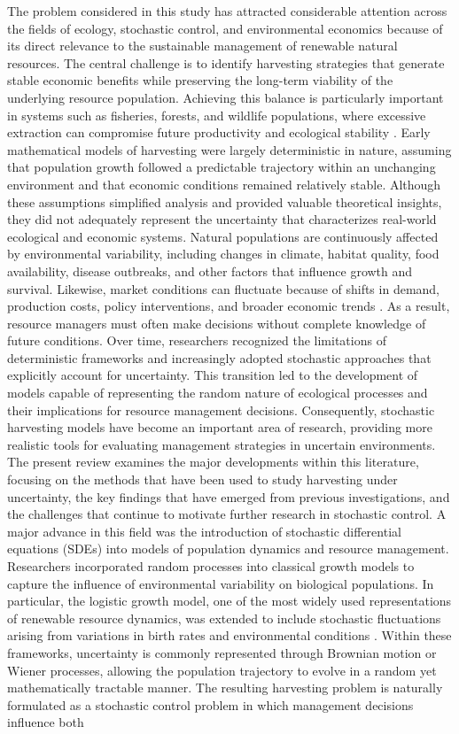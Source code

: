\documentclass[11pt]{article}
\begin{document}
	The problem considered in this study has attracted considerable attention across the fields of ecology, stochastic control, and environmental economics because of its direct relevance to the sustainable management of renewable natural resources. The central challenge is to identify harvesting strategies that generate stable economic benefits while preserving the long-term viability of the underlying resource population. Achieving this balance is particularly important in systems such as fisheries, forests, and wildlife populations, where excessive extraction can compromise future productivity and ecological stability \citep{pramanik2021consensus}. Early mathematical models of harvesting were largely deterministic in nature, assuming that population growth followed a predictable trajectory within an unchanging environment and that economic conditions remained relatively stable. Although these assumptions simplified analysis and provided valuable theoretical insights, they did not adequately represent the uncertainty that characterizes real-world ecological and economic systems. Natural populations are continuously affected by environmental variability, including changes in climate, habitat quality, food availability, disease outbreaks, and other factors that influence growth and survival. Likewise, market conditions can fluctuate because of shifts in demand, production costs, policy interventions, and broader economic trends \citep{pramanik2023cmbp,yusuf2025predictive}. As a result, resource managers must often make decisions without complete knowledge of future conditions. Over time, researchers recognized the limitations of deterministic frameworks and increasingly adopted stochastic approaches that explicitly account for uncertainty. This transition led to the development of models capable of representing the random nature of ecological processes and their implications for resource management decisions. Consequently, stochastic harvesting models have become an important area of research, providing more realistic tools for evaluating management strategies in uncertain environments. The present review examines the major developments within this literature, focusing on the methods that have been used to study harvesting under uncertainty, the key findings that have emerged from previous investigations, and the challenges that continue to motivate further research in stochastic control. A major advance in this field was the introduction of stochastic differential equations (SDEs) into models of population dynamics and resource management. Researchers incorporated random processes into classical growth models to capture the influence of environmental variability on biological populations. In particular, the logistic growth model, one of the most widely used representations of renewable resource dynamics, was extended to include stochastic fluctuations arising from variations in birth rates and environmental conditions \cite{brites_braumann_2023}. Within these frameworks, uncertainty is commonly represented through Brownian motion or Wiener processes, allowing the population trajectory to evolve in a random yet mathematically tractable manner. The resulting harvesting problem is naturally formulated as a stochastic control problem in which management decisions influence both 
\end{document}
